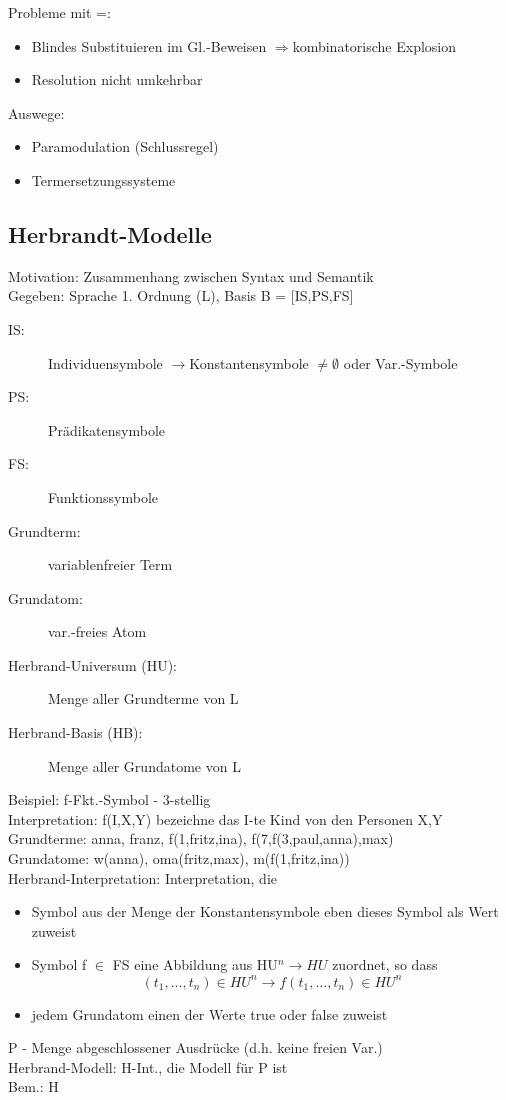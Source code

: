 \documentclass[a4paper,14pt]{article}
\begin{document}
Probleme mit \glqq{}=\grqq{}:
\begin{itemize}
  \item Blindes Substituieren im Gl.-Beweisen $\Rightarrow$kombinatorische Explosion
  \item Resolution nicht umkehrbar
\end{itemize}
Auswege:
\begin{itemize}
 \item Paramodulation (Schlussregel)
 \item Termersetzungssysteme
\end{itemize}

\subsection{Herbrandt-Modelle}
Motivation: Zusammenhang zwischen Syntax und Semantik\\
Gegeben: Sprache 1. Ordnung (L), Basis B = [IS,PS,FS]
\begin{description}
 \item[IS:] Individuensymbole $\rightarrow$Konstantensymbole $\neq\emptyset$ oder Var.-Symbole
 \item[PS:] Prädikatensymbole
 \item[FS:] Funktionssymbole
 \item[Grundterm:] variablenfreier Term
 \item[Grundatom:] var.-freies Atom
 \item[Herbrand-Universum (HU):] Menge aller Grundterme von L
 \item[Herbrand-Basis (HB):] Menge aller Grundatome von L
\end{description}

Beispiel: f-Fkt.-Symbol - 3-stellig\\
Interpretation: f(I,X,Y) bezeichne das I-te Kind von den Personen X,Y\\
Grundterme: anna, franz, f(1,fritz,ina), f(7,f(3,paul,anna),max)\\
Grundatome: w(anna), oma(fritz,max), m(f(1,fritz,ina))\\
Herbrand-Interpretation: Interpretation, die
\begin{itemize}
 \item Symbol aus der Menge der Konstantensymbole eben dieses Symbol als Wert zuweist
 \item Symbol f $\in$ FS eine Abbildung aus HU$^n\rightarrow HU$ zuordnet, so dass $$(t_1,\dots,t_n)\in HU^n \rightarrow f(t_1,\dots,t_n)\in HU^n $$
 \item jedem Grundatom einen der Werte true oder false zuweist
\end{itemize}
P -  Menge abgeschlossener Ausdrücke (d.h. keine freien Var.)\\
Herbrand-Modell: H-Int., die Modell für P ist\\
Bem.: H\\
\end{document}
